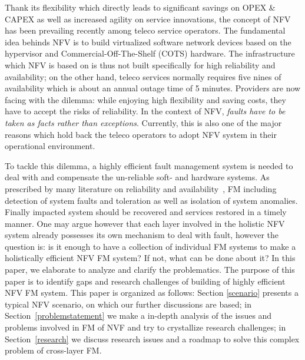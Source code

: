 \label{intro}
Thank its flexibility which directly leads to significant savings on OPEX \&
CAPEX as well as increased agility on service innovations, the concept of
NFV~\cite{nfv} has been prevailing recently among teleco service operators. The
fundamental idea behinds NFV is to build virtualized software network devices
based on the hypervisor and Commercial-Off-The-Shelf (COTS) hardware. The
infrastructure which NFV is based on is thus not built specifically for high
reliability and availability; on the other hand, teleco services normally
requires five nines of availability which is about an annual outage time of 5
minutes. Providers are now facing with the dilemma: while enjoying high
flexibility and saving costs, they have to accept the risks of reliability. In
the context of NFV, \textit{faults have to be taken as facts rather than
exceptions}. Currently, this is also one of the major reasons which hold back
the teleco operators to adopt NFV system in their operational environment.

To tackle this dilemma, a highly efficient fault management system is needed to
deal with and compensate the un-reliable soft- and hardware systems.  As
prescribed by many literature on reliability and availability~\cite{depdef}, FM
including detection of system faults and toleration as well as isolation of
system anomalies. Finally impacted system should be recovered and services
restored in a timely manner. One may argue however that each layer involved in
the holistic NFV system already possesses its own mechanism to deal with fault,
however the question is: is it enough to have a collection of individual FM
systems to make a holistically efficient NFV FM system? If not, what can be done
about it? In this paper, we elaborate to analyze and clarify the problematics.
The purpose of this paper is to identify gaps and research challenges of
building of highly efficient NFV FM system. This paper is organized as follows:
Section \ref{scenario} presents a typical NFV scenario, on which our further
discussions are based; in Section~\ref{problemstatement} we make a in-depth
analysis of the issues and problems involved in FM of NVF and try to crystallize
research challenges; in Section~\ref{research} we discuss research issues and a
roadmap to solve this complex problem of cross-layer FM.  
